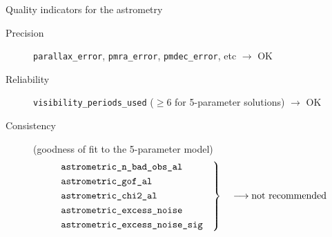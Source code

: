 \documentclass[smaller, aspectratio=169]{beamer}
\begin{document}
%
%
\begin{agaframe}{Quality indicators for the astrometry}
  \begin{center}
    \begin{description}
      \item[Precision] \texttt{parallax\_error}, \texttt{pmra\_error}, \texttt{pmdec\_error}, etc
        \hfill $\longrightarrow$ OK \hskip1cm\null
      \item[Reliability] \texttt{visibility\_periods\_used} ($\geq6$ for 5-parameter solutions)
        \hfill $\longrightarrow$ OK \hskip1cm\null
      \item[Consistency] (goodness of fit to the 5-parameter model)
        \begin{equation*}
          \left .
          \begin{gathered}
            \text{\tt astrometric\_n\_bad\_obs\_al} \hfill \\
            \text{\tt astrometric\_gof\_al} \hfill \\
            \text{\tt astrometric\_chi2\_al} \hfill \\
            \text{\tt astrometric\_excess\_noise} \hfill \\
            \text{\tt astrometric\_excess\_noise\_sig}  \hfill
          \end{gathered}\quad
        \right \} \quad \longrightarrow \text{not recommended}
        \end{equation*}
    \end{description}
  \end{center}
\end{agaframe}
%
%
\end{document}
